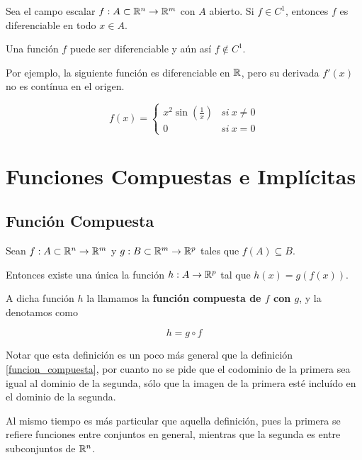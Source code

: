 \begin{theorem}
Sea el campo escalar $ f : A \subset \mathbb{R}^n \to \mathbb{R}^m$ con $A$ abierto.
Si $ f \in C^1$, entonces $f$ es diferenciable en todo $x \in A$.
\end{theorem}

\begin{observation}
Una función $f$ puede ser diferenciable y aún así $ f \not\in C^1$.
\end{observation}

Por ejemplo, la siguiente función es diferenciable en $\mathbb{R}$, pero su derivada $f'(x)$ no es contínua en el origen.

$$ f(x) = \begin{cases} x^2 \sin(\frac{1}{x}) & si \ x \neq 0 \\ 0 & si \ x=0 \end{cases} $$


\chapter{Funciones Compuestas e Implícitas}

\section{Función Compuesta}

\begin{definition}
Sean $ f : A \subset \mathbb{R}^n \to \mathbb{R}^m$ y $ g : B \subset \mathbb{R}^m \to \mathbb{R}^p$ tales que $f(A) \subseteq B$.

Entonces existe una única la función $ h : A \to \mathbb{R}^p$ tal que $h(x) = g(f(x))$.  

A dicha función $h$ la llamamos la \textbf{función compuesta de $f$ con $g$}, y la denotamos como 

$$ h = g \circ f$$
\end{definition}

Notar que esta definición es un poco más general que la definición \ref{funcion_compuesta}, por cuanto no se pide que el codominio de la primera sea igual al dominio de la segunda, sólo que la imagen de la primera esté incluído en el dominio de la segunda.

Al mismo tiempo es más particular que aquella definición, pues la primera se refiere funciones entre conjuntos en general, mientras que la segunda es entre subconjuntos de $\mathbb{R}^n$.

